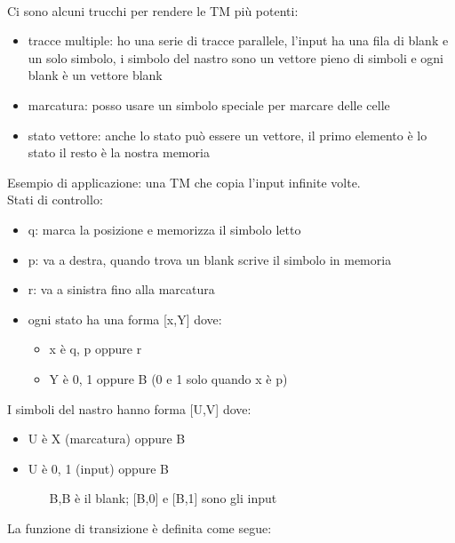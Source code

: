 \documentclass[12pt]{article}
\begin{document}
\\ Ci sono alcuni trucchi per rendere le TM più potenti:\begin{itemize}
    \item tracce multiple: ho una serie di tracce parallele, l'input ha una fila di blank e un solo simbolo, i simbolo del nastro sono un vettore pieno di simboli e ogni blank è un vettore blank
    \item marcatura: posso usare un simbolo speciale per marcare delle celle
    \item stato vettore: anche lo stato può essere un vettore, il primo elemento è lo stato il resto è la nostra memoria
\end{itemize}
Esempio di applicazione: una TM che copia l'input infinite volte.
\\ Stati di controllo: 
\begin{itemize}
    \item q: marca la posizione e memorizza il simbolo letto
    \item p: va a destra, quando trova un blank scrive il simbolo in memoria
    \item r: va a sinistra fino alla marcatura
    \item ogni stato ha una forma [x,Y] dove: 
        \begin{itemize}
            \item x è q, p oppure r
            \item Y è 0, 1 oppure B (0 e 1 solo quando x è p)
        \end{itemize}
\end{itemize}
I simboli del nastro hanno forma [U,V] dove:
\begin{itemize}
    \item U è X (marcatura) oppure B
    \item U è 0, 1 (input) oppure B 
        \begin{itemize}
            \item [B,B] è il blank; [B,0] e [B,1] sono gli input
        \end{itemize}
\end{itemize}
La funzione di transizione è definita come segue: 
\end{document}

